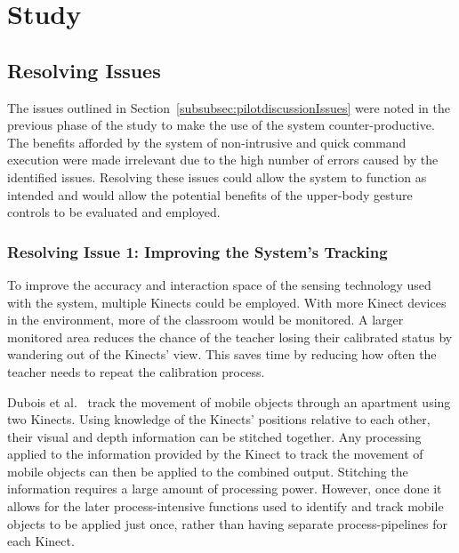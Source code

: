 \documentclass[link]{IWCOMP}
\begin{document}
\section{Study}
\label{sec:study}


\subsection{Resolving Issues}
\label{subsec:studyResolvingIssues}


The issues outlined in Section~\ref{subsubsec:pilotdiscussionIssues} were noted in the previous phase of the study to make the use of the system counter-productive.
The benefits afforded by the system of non-intrusive and quick command execution were made irrelevant due to the high number of errors caused by the identified issues.
Resolving these issues could allow the system to function as intended and would allow the potential benefits of the upper-body gesture controls to be evaluated and employed.

\subsubsection{Resolving Issue 1: Improving the System's Tracking}
\label{subsubsec:studyResolvingIssues1}

To improve the accuracy and interaction space of the sensing technology used with the system, multiple Kinects could be employed.
With more Kinect devices in the environment, more of the classroom would be monitored.
A larger monitored area reduces the chance of the teacher losing their calibrated status by wandering out of the Kinects' view.
This saves time by reducing how often the teacher needs to repeat the calibration process.

Dubois et al.~\cite{Dubois2011} track the movement of mobile objects through an apartment using two Kinects.
Using knowledge of the Kinects' positions relative to each other, their visual and depth information can be stitched together.
Any processing applied to the information provided by the Kinect to track the movement of mobile objects can then be applied to the combined output.
Stitching the information requires a large amount of processing power.
However, once done it allows for the later process-intensive functions used to identify and track mobile objects to be applied just once, rather than having separate process-pipelines for each Kinect.
\end{document}

